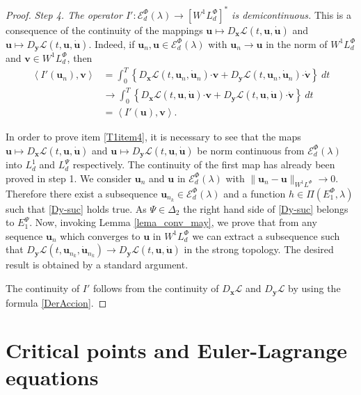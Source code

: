 \documentclass[twoside]{article}
\theoremstyle{remark}
\newcommand{\lphi}{L^{\Phi}}
\newcommand{\lpsi}{L^{\Psi}}
\newcommand{\ephi}{E^{\Phi}}
\newcommand{\wphi}{W^{1}\lphi}
\newcommand{\sobnor}{\|_{W^{1}\lphi}}
\newcommand{\domi}{\mathcal{E}^{\Phi}_d(\lambda)}
\renewcommand{\b}[1]{\boldsymbol{#1}}
\newcommand{\ccdot}{\b{\cdot}}
\newcommand{\epsi}{E^{\Psi}}
\begin{document}
\begin{proof}
\emph{Step 4. The operator $I':\domi  \to \left[\wphi_d
\right]^* $ is demicontinuous.}
This is a consequence  of the continuity of the mappings $\b{u} \mapsto D_{\b{x}}\mathcal{L}(t,\b{u},\b{\dot{u}})$ and $\b{u} \mapsto
D_{\b{y}}\mathcal{L}(t,\b{u},\b{\dot{u}})$. Indeed, if $\b{u}_n,\b{u}\in \domi$ with $\b{u}_n\to \b{u}$ in the norm of $\wphi_d$ and $\b{v} \in
\wphi_d$, then
\[
\begin{split}
\left\langle  I'(\b{u}_{n}),\b{v} \right\rangle &= \int_0^T \left\{  D_{\b{x}}\mathcal{L}\left(t,\b{u}_n,\b{\dot{u}}_n\right)\ccdot
\b{v} +
 D_{\b{y}}\mathcal{L}\left(t,\b{u}_n,\b{\dot{u}}_n\right)\ccdot\b{\dot{v}}\right\} \ dt\\
&\rightarrow \int_0^T \left\{ D_{\b{x}}\mathcal{L}\left(t,\b{u},\b{\dot{u}}\right)\ccdot \b{v}+ 
D_{\b{y}}\mathcal{L}\left(t,\b{u},\b{\dot{u}}\right)\ccdot\b{\dot{v}}\right\} \ dt\\
&=\left\langle  I'(\b{u}),\b{v} \right\rangle.
\end{split}
\]


In order to prove item  \ref{T1item4}, it is necessary to see that the maps $\b{u}\mapsto D_{\b{x}}\mathcal{L}(t,\b{u},\b{\dot{u}})$  and $\b{u}\mapsto D_{\b{y}}\mathcal{L}(t,\b{u},\b{\dot{u}})$  be norm continuous
from $\domi $ into $L^1_d$ and
 $\lpsi_d$ respectively.  The continuity of the first map has already been proved in step 1. We consider $\b{u}_n$ and $\b{u}$ in $\domi$ with $\|\b{u}_n- \b{u}\sobnor\to 0$. Therefore   there exist a subsequence $\b{u}_{n_k}\in \domi$ and a function $h\in\Pi(\ephi_1,\lambda)$  such that   \eqref{Dy-suc} holds true. As  $\Psi\in\Delta_2$ 
the right hand side of  \eqref{Dy-suc} belongs to $\epsi_1$. Now, invoking  Lemma \ref{lema_conv_may}, we  prove that
  from any sequence $\b{u}_n$ which converges to $\b{u}$ in $\wphi_d$ we can
extract a subsequence such that   $D_{\b{y}}\mathcal{L}(t,\b{u}_{n_k},\b{\dot{u}}_{n_k})\to D_{\b{y}}\mathcal{L}(t,\b{u},\b{\dot{u}})$ in the strong topology. The desired result is obtained by a standard argument.

The continuity of $I'$  follows  from the continuity 
of $D_{\b{x}}\mathcal{L}$ and $D_{\b{y}}\mathcal{L}$ by using the formula \eqref{DerAccion}.
\end{proof}



\section{Critical points and Euler-Lagrange equations}\label{sec:equa-min}
\end{document}
